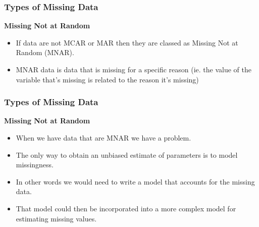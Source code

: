 \documentclass[MASTER.tex]{subfiles}
\begin{document}
	\begin{frame}
		\frametitle{Types of Missing Data}
		\Large
\noindent \textbf{Missing Not at Random}		
\begin{itemize}
\item 	If data are not MCAR or MAR then they are classed as Missing Not at Random (MNAR). 
\item MNAR data is data that is missing for a specific reason (ie. the value of the variable that's missing is related to the reason it's missing)
\end{itemize}
\end{frame}
%		
	\begin{frame}
		\frametitle{Types of Missing Data}
		\Large
		\noindent \textbf{Missing Not at Random}
		\begin{itemize}
\item When we have data that are MNAR we have a problem. 
\item The only way to obtain an unbiased estimate of parameters is to model missingness. 
\item In other words we would need to write a model that accounts for the missing data. 
\item That model could then be incorporated into a more complex model for estimating missing values. 

		\end{itemize}
		
	\end{frame}
\end{document}
